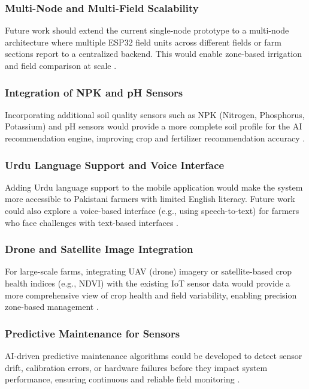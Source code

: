 \subsubsection{Multi-Node and Multi-Field Scalability}

Future work should extend the current single-node prototype to 
a multi-node architecture where multiple ESP32 field units 
across different fields or farm sections report to a centralized 
backend. This would enable zone-based irrigation and field 
comparison at scale \cite{Tzounis2017}.

\subsubsection{Integration of NPK and pH Sensors}

Incorporating additional soil quality sensors such as NPK 
(Nitrogen, Phosphorus, Potassium) and pH sensors would 
provide a more complete soil profile for the AI recommendation 
engine, improving crop and fertilizer recommendation accuracy 
\cite{mansoor2025iot}.

\subsubsection{Urdu Language Support and Voice Interface}

Adding Urdu language support to the mobile application 
would make the system more accessible to Pakistani farmers 
with limited English literacy. Future work could also explore 
a voice-based interface (e.g., using speech-to-text) for 
farmers who face challenges with text-based interfaces 
\cite{mobileui2022}.

\subsubsection{Drone and Satellite Image Integration}

For large-scale farms, integrating UAV (drone) imagery or 
satellite-based crop health indices (e.g., NDVI) with the 
existing IoT sensor data would provide a more comprehensive 
view of crop health and field variability, enabling 
precision zone-based management \cite{mansoor2025iot}.

\subsubsection{Predictive Maintenance for Sensors}

AI-driven predictive maintenance algorithms could be developed 
to detect sensor drift, calibration errors, or hardware 
failures before they impact system performance, ensuring 
continuous and reliable field monitoring 
\cite{emon2025iot}.

